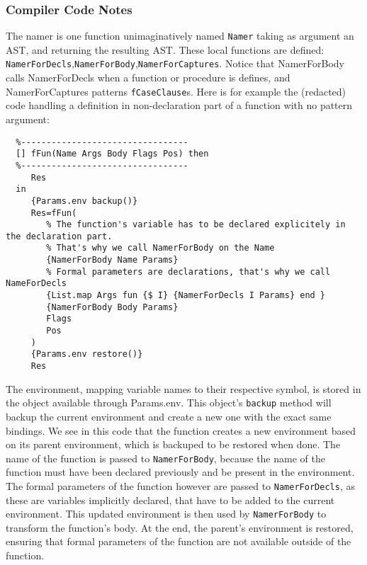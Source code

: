 \documentclass[a4paper]{memoir}
\begin{document}


\subsubsection{Compiler Code Notes}
The namer is one function unimaginatively named \lstinline!Namer! taking as argument an AST, and returning the resulting AST.
These local functions are defined: \lstinline!NamerForDecls!,\lstinline!NamerForBody!,\lstinline!NamerForCaptures!.
Notice that NamerForBody calls NamerForDecls when a function or procedure is
defines, and NamerForCaptures patterns \lstinline!fCaseClause!s. Here is for
example the (redacted) code handling a definition in non-declaration part of a
function with no pattern argument:

\begin{lstlisting}
  %---------------------------------
  [] fFun(Name Args Body Flags Pos) then
  %---------------------------------
     Res
  in
     {Params.env backup()} 
     Res=fFun(
        % The function's variable has to be declared explicitely in the declaration part.
        % That's why we call NamerForBody on the Name
        {NamerForBody Name Params}
        % Formal parameters are declarations, that's why we call NameForDecls
        {List.map Args fun {$ I} {NamerForDecls I Params} end }
        {NamerForBody Body Params}
        Flags
        Pos
     )
     {Params.env restore()}
     Res
\end{lstlisting}
The environment, mapping variable names to their respective symbol, is stored in the object available through Params.env. This object's \lstinline!backup! method will backup the current environment and create a new one with the exact same bindings.
We see in this code that the function creates a new environment based on its parent environment, which is backuped to be restored when done. The name of the function is passed to \lstinline!NamerForBody!, because the name of the function must have been declared previously and be present in the environment. 
The formal parameters of the function however are passed to \lstinline!NamerForDecls!, as these are variables implicitly declared, that have to be added to the current environment. This updated environment is then used by \lstinline!NamerForBody! to transform the function's body.
At the end, the parent's environment is restored, ensuring that formal parameters of the function are not available outside of the function.
\end{document}

